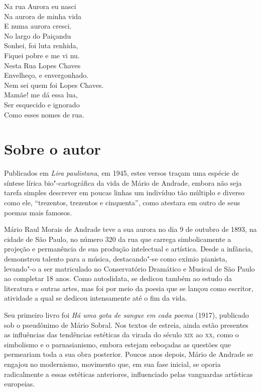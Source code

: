 

\epigraph{Na rua Aurora eu nasci\\
Na aurora de minha vida\\
E numa aurora cresci.\\[5pt]
No largo do Paiçandu\\
Sonhei, foi luta renhida,\\
Fiquei pobre e me vi nu.\\[5pt]
Nesta Rua Lopes Chaves\\
Envelheço, e envergonhado.\\
Nem sei quem foi Lopes Chaves.\\[5pt]
Mamãe! me dá essa lua,\\
Ser esquecido e ignorado\\
Como esses nomes de rua.}{}

\section{Sobre o autor}

\noindent{}Publicados em
\emph{Lira paulistana}, em 1945, estes versos traçam uma espécie de
síntese lírica bio"-cartográfica da vida de Mário de Andrade, embora não
seja tarefa simples descrever em poucas linhas um indivíduo tão múltiplo
e diverso como ele, ``trezentos, trezentos e cinquenta'', como atestara
em outro de seus poemas mais famosos.

Mário Raul Morais de Andrade teve a sua aurora no dia 9 de outubro de
1893, na cidade de São Paulo, no número 320 da rua que carrega
simbolicamente a projeção e permanência de sua produção intelectual e
artística. Desde a infância, demonstrou talento para a música,
destacando"-se como exímio pianista, levando"-o a ser matriculado no
Conservatório Dramático e Musical de São Paulo ao completar 18 anos.
Como autodidata, se dedicou também ao estudo da literatura e outras
artes, mas foi por meio da poesia que se lançou como escritor, atividade
a qual se dedicou intensamente até o fim da vida.

Seu primeiro livro foi \emph{Há uma gota de sangue em cada poema}
(1917), publicado sob o pseudônimo de Mário Sobral. Nos textos de
estreia, ainda estão presentes as influências das tendências estéticas
da virada do século \textsc{xix} ao \textsc{xx}, como o simbolismo e o parnasianismo,
embora estejam esboçadas as questões que permeariam toda a sua obra
posterior. Poucos anos depois, Mário de Andrade se engajou no
modernismo, movimento que, em sua fase inicial, se oporia radicalmente a
essas estéticas anteriores, influenciado pelas vanguardas artísticas
europeias.

